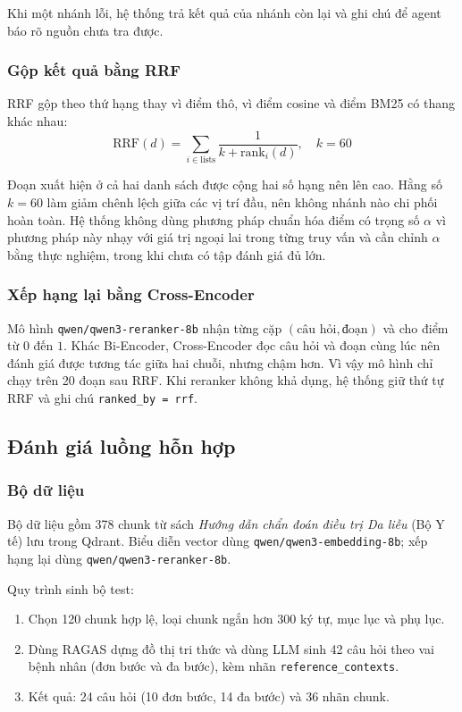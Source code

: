 Khi một nhánh lỗi, hệ thống trả kết quả của nhánh còn lại và ghi chú để agent báo rõ nguồn chưa tra được.

\subsubsection{Gộp kết quả bằng RRF}

RRF gộp theo thứ hạng thay vì điểm thô, vì điểm cosine và điểm BM25 có thang khác nhau:
\begin{equation}
  \mathrm{RRF}(d)=\sum_{i\in \mathrm{lists}} \frac{1}{k+\mathrm{rank}_{i}(d)},\quad k=60
\end{equation}

Đoạn xuất hiện ở cả hai danh sách được cộng hai số hạng nên lên cao. Hằng số $k=60$ làm giảm chênh lệch giữa các vị trí đầu, nên không nhánh nào chi phối hoàn toàn. Hệ thống không dùng phương pháp chuẩn hóa điểm có trọng số $\alpha$ vì phương pháp này nhạy với giá trị ngoại lai trong từng truy vấn và cần chỉnh $\alpha$ bằng thực nghiệm, trong khi chưa có tập đánh giá đủ lớn.

\subsubsection{Xếp hạng lại bằng Cross-Encoder}

Mô hình \texttt{qwen/qwen3-reranker-8b} nhận từng cặp $(\text{câu hỏi},\text{đoạn})$ và cho điểm từ $0$ đến $1$. Khác Bi-Encoder, Cross-Encoder đọc câu hỏi và đoạn cùng lúc nên đánh giá được tương tác giữa hai chuỗi, nhưng chậm hơn. Vì vậy mô hình chỉ chạy trên 20 đoạn sau RRF. Khi reranker không khả dụng, hệ thống giữ thứ tự RRF và ghi chú \texttt{ranked\_by = rrf}.

\subsection{Đánh giá luồng hỗn hợp}

\subsubsection{Bộ dữ liệu}

Bộ dữ liệu gồm 378 chunk từ sách \textit{Hướng dẫn chẩn đoán điều trị Da liễu} (Bộ Y tế) lưu trong Qdrant. Biểu diễn vector dùng \texttt{qwen/qwen3-embedding-8b}; xếp hạng lại dùng \texttt{qwen/qwen3-reranker-8b}.

Quy trình sinh bộ test:
\begin{enumerate}
  \item Chọn 120 chunk hợp lệ, loại chunk ngắn hơn 300 ký tự, mục lục và phụ lục.
  \item Dùng RAGAS dựng đồ thị tri thức và dùng LLM sinh 42 câu hỏi theo vai bệnh nhân (đơn bước và đa bước), kèm nhãn \texttt{reference\_contexts}.
  \item Kết quả: 24 câu hỏi (10 đơn bước, 14 đa bước) và 36 nhãn chunk.
\end{enumerate}

